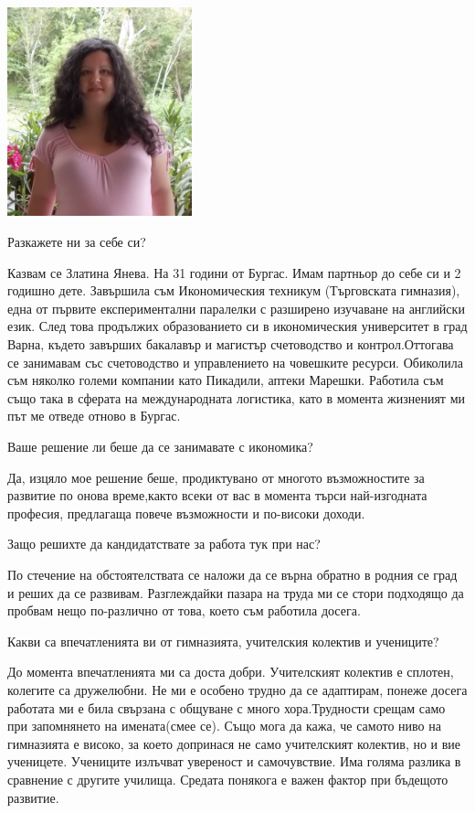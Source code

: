 \begin{multicols}{3}

\noindent \includegraphics[width=2.1in]{./Jneva/Jneva.jpg}

Разкажете ни за себе си?

Казвам се Златина Янева. На 31 години от Бургас. Имам партньор до себе си и 2 
годишно дете. Завършила съм Икономическия техникум (Търговската гимназия), една 
от първите експериментални паралелки с разширено изучаване на английски език. 
След това продължих образованието си в икономическия университет в град Варна, 
където завърших бакалавър и магистър счетоводство и контрол.Оттогава се 
занимавам със счетоводство и управлението на човешките ресурси. Обиколила съм 
няколко големи компании като Пикадили, аптеки Марешки. Работила съм също така в 
сферата на международната логистика, като в момента жизненият ми път ме отведе 
отново в Бургас.

Ваше решение ли беше да се занимавате с икономика?

Да, изцяло мое решение беше, продиктувано от многото възможностите за развитие 
по онова време,както всеки от вас в момента търси най-изгодната професия, 
предлагаща повече възможности и по-високи доходи.

Защо решихте да кандидатствате за работа тук при нас?

По стечение на обстоятелствата се наложи да се върна обратно  в родния се град и 
реших да се развивам. Разглеждайки пазара на труда ми се стори подходящо да 
пробвам нещо по-различно от това, което съм работила досега.

Какви са впечатленията ви от гимназията, учителския колектив и учениците?

До момента впечатленията ми са доста добри. Учителският колектив е сплотен, 
колегите са дружелюбни. Не ми е особено трудно да се адаптирам, понеже досега 
работата ми е била свързана с общуване с много хора.Трудности срещам само при 
запомнянето на имената(смее се). Също мога да кажа, че самото ниво на гимназията 
е високо, за което допринася не само учителският колектив, но и вие ученицете. 
Учениците излъчват увереност и самочувствие. Има голяма разлика в сравнение с 
другите училища. Средата понякога е важен фактор при бъдещото развитие.


\end{multicols}
